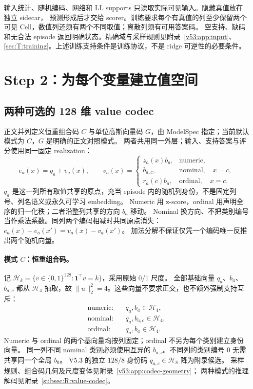 \documentclass[11pt,UTF8,fontset=fandol]{ctexart}
\numberwithin{equation}{section}
\theoremstyle{definition}
\begin{document}
输入统计、随机编码、网络和 LL supports 只读取实际可见输入。隐藏真值放在独立 sidecar，
预测形成后才交给 scorer。训练要求每个有真值的列至少保留两个可见 Cell，数值列还须有两个不同取值；离散列须有可用答案码。
空支持、缺码和无合法 episode 返回明确状态。精确域与采样规则见附录~\ref{v53:app:input}、
\ref{sec:T:training}。上述训练支持条件是训练协议，不是 ridge 可逆性的必要条件。

\section{Step 2：为每个变量建立值空间}
\label{front:sec:step2}\label{sec:E:encoding}
\subsection{两种可选的 128 维 value codec}
\label{v53:subsec:codec-options}
正文并列定义恒重组合码 $C$ 与单位高斯向量码 $G$，由 ModelSpec 指定；当前默认模式为 $C$，$G$ 是明确的正文对照模式。
两者共用同一外层；输入、支持答案与评分使用同一固定 realization：
\begin{equation}
 \boxed{e_a(x)=q_a+v_a(x)},\qquad
 v_a(x)=\begin{cases}
 z_a(x)b_a,&\text{numeric},\\
 b_{a,c},&\text{nominal},\quad x=c,\\
 r_a(c)b_a,&\text{ordinal},\quad x=c.
 \end{cases}
 \label{v53:eq:gaussian-code-option}
\end{equation}
$q_a$ 是这一列所有取值共享的原点，充当 episode 内的随机列身份，不是固定列号、列名语义或永久可学习 embedding。
Numeric 用 z-score，ordinal 用声明全序的归一化秩；二者沿整列共享的方向 $b_a$ 移动。
Nominal 换方向、不把类别编号当作乘法系数。同列两个编码相减时共同原点消失：$e_a(x)-e_a(x')=v_a(x)-v_a(x')$。
加法分解不保证仅凭一个编码唯一反推出两个随机向量。

\paragraph{模式 $C$：恒重组合码。}
记 $\mathcal H_k=\{v\in\{0,1\}^{128}:\mathbf1^\top v=k\}$，采用原始 $0/1$ 尺度。
全部基础向量 $q_a$、$b_a$、$b_{a,c}$ 都从 $\mathcal H_4$ 抽取，故 $\|u\|_2^2=4$。这些向量不要求正交，也不额外强制支持互斥：
\begin{equation}
 \begin{aligned}
 \text{numeric}:&\quad q_a,b_a\in\mathcal H_4,\\
 \text{nominal}:&\quad q_a,b_{a,c}\in\mathcal H_4,\\
 \text{ordinal}:&\quad q_a,b_a\in\mathcal H_4.
 \end{aligned}
 \label{v53:eq:compositional-code-option}
\end{equation}
Numeric 与 ordinal 的两个基向量均按列固定；ordinal 不另为每个类别建立身份向量。
同一列不同 nominal 类别必须使用互异的 $b_{a,c}$。不同列的类别编号 $0$ 无需共享同一个全局 $b_0$。
V5.3 的独立 $128/8$ 身份码 $q_{a,c}\in\mathcal H_8$ 降为附录候选。
采样规则、组合码几何及尺度变体见附录~\ref{v53:app:codec-geometry}；
两种模式的推理解码见附录~\ref{subsec:R:value-codec}。
\end{document}
